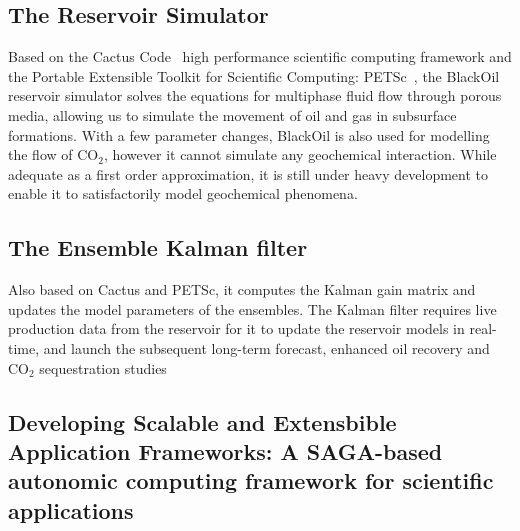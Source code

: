 \documentclass{rspublic}
\begin{document}
\subsection{The Reservoir Simulator} 

Based on the Cactus Code~\citep{cactus_web} high performance
scientific computing framework and the Portable Extensible Toolkit for
Scientific Computing: PETSc~\citep{PETSc}, the BlackOil reservoir
simulator solves the equations for multiphase fluid flow through
porous media, allowing us to simulate the movement of oil and gas in
subsurface formations. With a few parameter changes, BlackOil is also
used for modelling the flow of CO$_2$, however it cannot simulate any
geochemical interaction. While adequate as a first order
approximation, it is still under heavy development to enable it to
satisfactorily model geochemical phenomena.

\subsection{The Ensemble Kalman filter} 

Also based on Cactus and PETSc, it computes the Kalman gain matrix and
updates the model parameters of the ensembles. The Kalman filter
requires live production data from the reservoir for it to update the
reservoir models in real-time, and launch the subsequent long-term
forecast, enhanced oil recovery and CO$_2$ sequestration studies


\subsection{Developing Scalable and Extensbible Application
  Frameworks: A SAGA-based autonomic computing framework for
  scientific applications}
\end{document}
